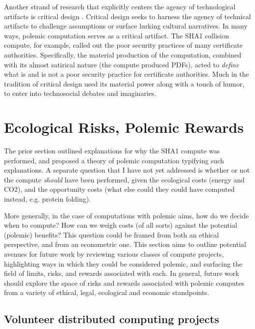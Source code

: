 \documentclass[sigconf]{acmart}
\begin{document}
Another strand of research that explicitly centers the agency of technological artifacts
is critical design \cite{Dunne2001}.
Critical design seeks to harness the agency of technical artifacts 
to challenge assumptions or surface lurking cultural narratives.
In many ways, polemic computation serves as a critical artifact.
The SHA1 collision compute, for example, 
called out the poor security practices of many certificate authorities.
Specifically, the material production of the computation,
combined with its almost satirical nature (the compute produced PDFs),
acted to \emph{define} what is and is not a poor security practice for certificate authorities.
Much in the tradition of critical design
used its material power \cite{Bennett2013a} along with a touch of humor, to enter into technosocial debates and imaginaries.


\section{Ecological Risks, Polemic Rewards}
\label{sec:org6ab58e5}

The prior section outlined explanations for why the SHA1 compute was performed, 
and proposed a theory of polemic computation typifying such explanations.
A separate question that I have not yet addressed 
is whether or not the compute \emph{should} have been performed,
given the ecological costs (energy and CO2), and the opportunity costs (what else could they could have computed instead, e.g. protein folding). 

More generally, in the case of computations with polemic aims,
how do we decide when to compute?
How can we weigh costs (of all sorts) against the potential (polemic) benefits?
This question could be framed from both an ethical perspective, 
and from an econometric one.
This section aims to outline potential avenues for future work
by reviewing various classes of compute projects,
highlighting ways in which they could be considered polemic,
and surfacing the field of limits, risks, and rewards associated with each.
In general, future work should explore the space of risks and rewards
associated with polemic computes from a variety of ethical, legal, ecological and economic standpoints.

\subsection{Volunteer distributed computing projects}
\label{sec:org9fcd927}
\end{document}
